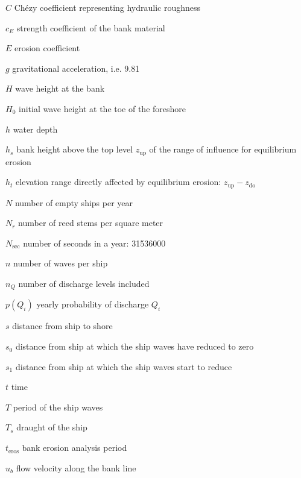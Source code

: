 \begin{symbollist}
\item[$C$] Ch\'ezy coefficient representing hydraulic roughness 
\item[$c_E$] strength coefficient of the bank material 
\item[$E$] erosion coefficient 
\item[$g$] gravitational acceleration, i.e. 9.81 
\item[$H$] wave height at the bank 
\item[$H_0$] initial wave height at the toe of the foreshore 
\item[$h$] water depth 
\item[$h_s$] bank height above the top level $z_\text{up}$ of the range of influence for equilibrium erosion 
\item[$h_t$] elevation range directly affected by equilibrium erosion: $z_\text{up} - z_\text{do}$ 
\item[$N$] number of empty ships per year 
\item[$N_r$] number of reed stems per square meter 
\item[$N_\text{sec}$] number of seconds in a year: 31536000 \unitbrackets{-}
\item[$n$] number of waves per ship \unitbrackets{-}
\item[$n_Q$] number of discharge levels included \unitbrackets{-}
\item[$p(Q_i)$] yearly probability of discharge $Q_i$ \unitbrackets{-}
\item[$s$] distance from ship to shore 
\item[$s_0$] distance from ship at which the ship waves have reduced to zero 
\item[$s_1$] distance from ship at which the ship waves start to reduce 
\item[$t$] time 
\item[$T$] period of the ship waves 
\item[$T_s$] draught of the ship 
\item[$t_\text{eros}$] bank erosion analysis period 
\item[$u_b$] flow velocity along the bank line 

\end{symbollist}
